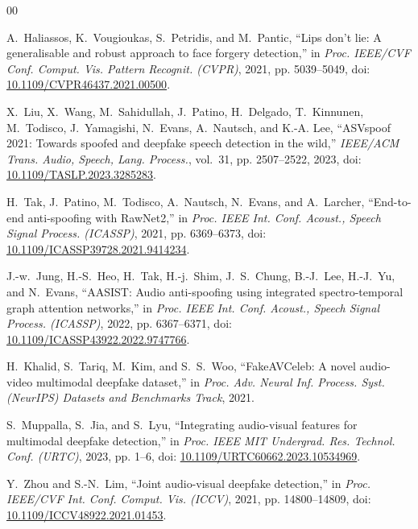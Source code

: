 \documentclass[conference]{IEEEtran}
\begin{document}
\begin{thebibliography}{00}
\balance

A.~Haliassos, K.~Vougioukas, S.~Petridis, and M.~Pantic, ``Lips don't lie: A generalisable and robust approach to face forgery detection,'' in \emph{Proc. IEEE/CVF Conf. Comput. Vis. Pattern Recognit. (CVPR)}, 2021, pp. 5039--5049, doi: \href{https://doi.org/10.1109/CVPR46437.2021.00500}{10.1109/CVPR46437.2021.00500}.

X.~Liu, X.~Wang, M.~Sahidullah, J.~Patino, H.~Delgado, T.~Kinnunen, M.~Todisco, J.~Yamagishi, N.~Evans, A.~Nautsch, and K.-A. Lee, ``ASVspoof 2021: Towards spoofed and deepfake speech detection in the wild,'' \emph{IEEE/ACM Trans. Audio, Speech, Lang. Process.}, vol.~31, pp. 2507--2522, 2023, doi: \href{https://doi.org/10.1109/TASLP.2023.3285283}{10.1109/TASLP.2023.3285283}.

H.~Tak, J.~Patino, M.~Todisco, A.~Nautsch, N.~Evans, and A.~Larcher, ``End-to-end anti-spoofing with RawNet2,'' in \emph{Proc. IEEE Int. Conf. Acoust., Speech Signal Process. (ICASSP)}, 2021, pp. 6369--6373, doi: \href{https://doi.org/10.1109/ICASSP39728.2021.9414234}{10.1109/ICASSP39728.2021.9414234}.

J.-w.~Jung, H.-S.~Heo, H.~Tak, H.-j.~Shim, J.~S.~Chung, B.-J.~Lee, H.-J.~Yu, and N.~Evans, ``AASIST: Audio anti-spoofing using integrated spectro-temporal graph attention networks,'' in \emph{Proc. IEEE Int. Conf. Acoust., Speech Signal Process. (ICASSP)}, 2022, pp. 6367--6371, doi: \href{https://doi.org/10.1109/ICASSP43922.2022.9747766}{10.1109/ICASSP43922.2022.9747766}.

H.~Khalid, S.~Tariq, M.~Kim, and S.~S.~Woo, ``FakeAVCeleb: A novel audio-video multimodal deepfake dataset,'' in \emph{Proc. Adv. Neural Inf. Process. Syst. (NeurIPS) Datasets and Benchmarks Track}, 2021.

S.~Muppalla, S.~Jia, and S.~Lyu, ``Integrating audio-visual features for multimodal deepfake detection,'' in \emph{Proc. IEEE MIT Undergrad. Res. Technol. Conf. (URTC)}, 2023, pp. 1--6, doi: \href{https://doi.org/10.1109/URTC60662.2023.10534969}{10.1109/URTC60662.2023.10534969}.

Y.~Zhou and S.-N.~Lim, ``Joint audio-visual deepfake detection,'' in \emph{Proc. IEEE/CVF Int. Conf. Comput. Vis. (ICCV)}, 2021, pp. 14800--14809, doi: \href{https://doi.org/10.1109/ICCV48922.2021.01453}{10.1109/ICCV48922.2021.01453}.


\end{thebibliography}
\end{document}
